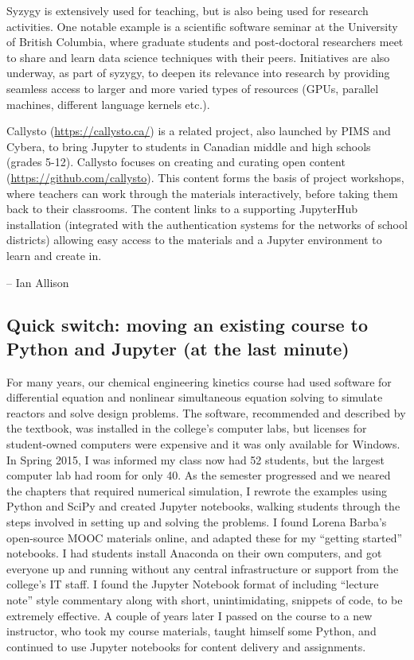 \documentclass[]{book}
\begin{document}
Syzygy is extensively used for teaching, but is also being used for
research activities. One notable example is a scientific software
seminar at the University of British Columbia, where graduate students
and post-doctoral researchers meet to share and learn data science
techniques with their peers. Initiatives are also underway, as part of
syzygy, to deepen its relevance into research by providing seamless
access to larger and more varied types of resources (GPUs, parallel
machines, different language kernels etc.).

Callysto (\url{https://callysto.ca/}) is a related project, also
launched by PIMS and Cybera, to bring Jupyter to students in Canadian
middle and high schools (grades 5-12). Callysto focuses on creating and
curating open content (\url{https://github.com/callysto}). This content
forms the basis of project workshops, where teachers can work through
the materials interactively, before taking them back to their
classrooms. The content links to a supporting JupyterHub installation
(integrated with the authentication systems for the networks of school
districts) allowing easy access to the materials and a Jupyter
environment to learn and create in.

-- Ian Allison

\subsection{Quick switch: moving an existing course to Python and
Jupyter (at the last
minute)}\label{quick-switch-moving-an-existing-course-to-python-and-jupyter-at-the-last-minute}

For many years, our chemical engineering kinetics course had used
software for differential equation and nonlinear simultaneous equation
solving to simulate reactors and solve design problems. The software,
recommended and described by the textbook, was installed in the
college's computer labs, but licenses for student-owned computers were
expensive and it was only available for Windows. In Spring 2015, I was
informed my class now had 52 students, but the largest computer lab had
room for only 40. As the semester progressed and we neared the chapters
that required numerical simulation, I rewrote the examples using Python
and SciPy and created Jupyter notebooks, walking students through the
steps involved in setting up and solving the problems. I found Lorena
Barba's open-source MOOC materials online, and adapted these for my
``getting started'' notebooks. I had students install Anaconda on their
own computers, and got everyone up and running without any central
infrastructure or support from the college's IT staff. I found the
Jupyter Notebook format of including ``lecture note'' style commentary
along with short, unintimidating, snippets of code, to be extremely
effective. A couple of years later I passed on the course to a new
instructor, who took my course materials, taught himself some Python,
and continued to use Jupyter notebooks for content delivery and
assignments.
\end{document}
